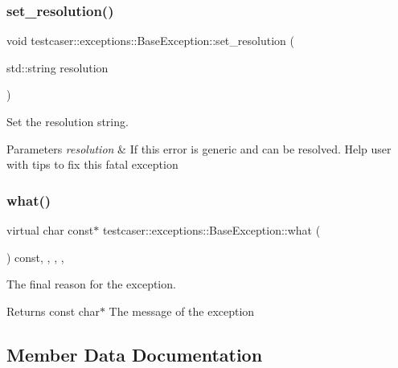 \subsubsection{\texorpdfstring{set\_resolution()}{set\_resolution()}}
{\footnotesize\ttfamily void testcaser\+::exceptions\+::\+Base\+Exception\+::set\+\_\+resolution (\begin{DoxyParamCaption}\item[{std\+::string}]{resolution }\end{DoxyParamCaption})\hspace{0.3cm}{\ttfamily [inline]}}



Set the resolution string. 


\begin{DoxyParams}{Parameters}
{\em resolution} & If this error is generic and can be resolved. Help user with tips to fix this fatal exception \\
\hline
\end{DoxyParams}
\mbox{\label{classtestcaser_1_1exceptions_1_1BaseException_a28590a861913f870d9761990853e74b7}} 
\subsubsection{\texorpdfstring{what()}{what()}}
{\footnotesize\ttfamily virtual char const$\ast$ testcaser\+::exceptions\+::\+Base\+Exception\+::what (\begin{DoxyParamCaption}{ }\end{DoxyParamCaption}) const\hspace{0.3cm}{\ttfamily [inline]}, {\ttfamily [final]}, {\ttfamily [override]}, {\ttfamily [virtual]}, {\ttfamily [noexcept]}}



The final reason for the exception. 

\begin{DoxyReturn}{Returns}
const char$\ast$ The message of the exception 
\end{DoxyReturn}


\subsection{Member Data Documentation}
\mbox{\label{classtestcaser_1_1exceptions_1_1BaseException_abfc26d4451ae832886c32ad2e283104e}} 
